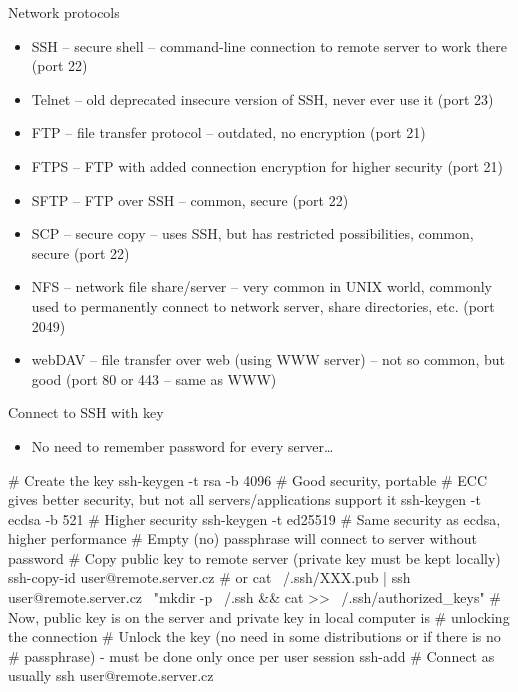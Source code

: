 \documentclass[compress, ucs, xelatex, 11pt, xcolor=svgnames,
  hyperref={
    bookmarks=true,
    unicode=true,
    colorlinks=true,
    pdftitle={Linux, command line and MetaCentrum},
    plainpages=false,
    pdfauthor={Vojtech Zeisek},
    pdfsubject={Course about use of Linux command line, writing shell scripts and using MetaCentrum of CESNET},
    pdfcreator={XeLaTeX},
    pdfkeywords={Linux, GNU, BASH, shell, command line, MetaCentrum},
    linkcolor=Red,
    anchorcolor=Blue,
    citecolor=Purple,
    filecolor=DodgerBlue,
    menucolor=DarkOrchid,
    urlcolor=DeepSkyBlue,
    pdftex},
  url={hyphens, lowtilde} %
  ]{beamer}
\begin{document}
\begin{frame}{Network protocols}
  \begin{itemize}
    \item SSH -- secure shell -- command-line connection to remote server to work there (port 22)
    \item Telnet -- old deprecated insecure version of SSH, never ever use it (port 23)
    \item FTP -- file transfer protocol -- outdated, no encryption (port 21)
    \item FTPS -- FTP with added connection encryption for higher security (port 21)
    \item SFTP -- FTP over SSH -- common, secure (port 22)
    \item SCP -- secure copy -- uses SSH, but has restricted possibilities, common, secure (port 22)
    \item NFS -- network file share/server -- very common in UNIX world, commonly used to permanently connect to network server, share directories, etc. (port 2049)
    \item webDAV -- file transfer over web (using WWW server) -- not so common, but good (port 80 or 443 -- same as WWW)
  \end{itemize}
\end{frame}

\begin{frame}[fragile]{Connect to SSH with key}
  \begin{itemize}
    \item No need to remember password for every server\ldots
  \end{itemize}
  \begin{bashcode}
    # Create the key
    ssh-keygen -t rsa -b 4096 # Good security, portable
    # ECC gives better security, but not all servers/applications support it
    ssh-keygen -t ecdsa -b 521 # Higher security
    ssh-keygen -t ed25519 # Same security as ecdsa, higher performance
    # Empty (no) passphrase will connect to server without password
    # Copy public key to remote server (private key must be kept locally)
    ssh-copy-id user@remote.server.cz # or
    cat ~/.ssh/XXX.pub | ssh user@remote.server.cz \
      "mkdir -p ~/.ssh && cat >> ~/.ssh/authorized_keys"
    # Now, public key is on the server and private key in local computer is
    # unlocking the connection
    # Unlock the key (no need in some distributions or if there is no
    # passphrase) - must be done only once per user session
    ssh-add
    # Connect as usually
    ssh user@remote.server.cz
  \end{bashcode}
\end{frame}
\end{document}
